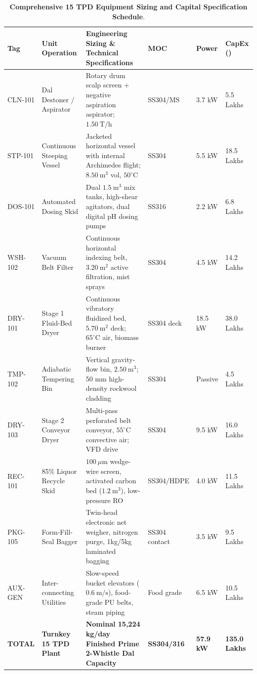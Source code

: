 \documentclass[10pt,a4paper]{article}
\newcommand{\inr}{\text{INR~}}
\begin{document}
\begin{table}[H]
\centering
\footnotesize
\setlength{\tabcolsep}{3.0pt}
\caption{\textbf{Comprehensive 15 TPD Equipment Sizing and Capital Specification Schedule}.}
\label{tab:equipment_schedule_q1_exp}
\begin{tabularx}{\linewidth}{p{1.4cm}p{2.8cm}p{5.5cm}p{1.8cm}p{1.6cm}>{\raggedright\arraybackslash}X}
\toprule
\textbf{Tag} & \textbf{Unit Operation} & \textbf{Engineering Sizing \& Technical Specifications} & \textbf{MOC} & \textbf{Power} & \textbf{CapEx (\inr)} \\
\midrule
CLN-101 & Dal Destoner / Aspirator & Rotary drum scalp screen + negative aspiration aspirator; $1.50\ \mathrm{T/h}$ & SS304/MS & 3.7 kW & \inr5.5 Lakhs \\
STP-101 & Continuous Steeping Vessel & Jacketed horizontal vessel with internal Archimedes flight; $8.50\ \mathrm{m}^3$ vol, $50^\circ\mathrm{C}$ & SS304 & 5.5 kW & \inr18.5 Lakhs \\
DOS-101 & Automated Dosing Skid & Dual $1.5\ \mathrm{m}^3$ mix tanks, high-shear agitators, dual digital pH dosing pumps & SS316 & 2.2 kW & \inr6.8 Lakhs \\
WSH-102 & Vacuum Belt Filter & Continuous horizontal indexing belt, $3.20\ \mathrm{m}^2$ active filtration, mist sprays & SS304 & 4.5 kW & \inr14.2 Lakhs \\
DRY-101 & Stage 1 Fluid-Bed Dryer & Continuous vibratory fluidized bed, $5.70\ \mathrm{m}^2$ deck; $65^\circ\mathrm{C}$ air, biomass burner & SS304 deck & 18.5 kW & \inr38.0 Lakhs \\
TMP-102 & Adiabatic Tempering Bin & Vertical gravity-flow bin, $2.50\ \mathrm{m}^3$; 50 mm high-density rockwool cladding & SS304 & Passive & \inr4.5 Lakhs \\
DRY-103 & Stage 2 Conveyor Dryer & Multi-pass perforated belt conveyor, $55^\circ\mathrm{C}$ convective air; VFD drive & SS304 & 9.5 kW & \inr16.0 Lakhs \\
REC-101 & 85\% Liquor Recycle Skid & $100\ \mu\mathrm{m}$ wedge-wire screen, activated carbon bed ($1.2\ \mathrm{m}^3$), low-pressure RO & SS304/HDPE & 4.0 kW & \inr11.5 Lakhs \\
PKG-105 & Form-Fill-Seal Bagger & Twin-head electronic net weigher, nitrogen purge, 1kg/5kg laminated bagging & SS304 contact & 3.5 kW & \inr9.5 Lakhs \\
AUX-GEN & Inter-connecting Utilities & Slow-speed bucket elevators ($0.6\ \mathrm{m/s}$), food-grade PU belts, steam piping & Food grade & 6.5 kW & \inr10.5 Lakhs \\
\midrule
\textbf{TOTAL} & \textbf{Turnkey 15 TPD Plant} & \textbf{Nominal 15,224 kg/day Finished Prime 2-Whistle Dal Capacity} & \textbf{SS304/316} & \textbf{57.9 kW} & \textbf{\inr135.0 Lakhs} \\
\bottomrule
\end{tabularx}
\end{table}
\end{document}
